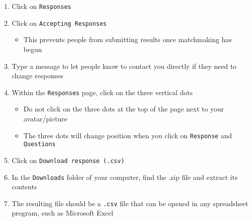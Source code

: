 \begin{enumerate}
	\item Click on \texttt{Responses}
	\item Click on \texttt{Accepting Responses}
		\begin{itemize}
			\item This prevents people from submitting results once matchmaking has begun
		\end{itemize}
	\item Type a message to let people know to contact you directly if they need to change responses
	\item Within the \texttt{Responses} page, click on the three vertical dots
		\begin{itemize}
			\item Do not click on the three dots at the top of the page next to your avatar/picture
			\item The three dots will change position when you click on \texttt{Response} and \texttt{Questions}
		\end{itemize}
	\item Click on \texttt{Download response (\texttt{.csv})}
	\item In the \texttt{Downloads} folder of your computer, find the .zip file and extract its contents
	\item The resulting file should be a \texttt{.csv} file that can be opened in any spreadsheet program, such as Microsoft Excel
\end{enumerate}









































